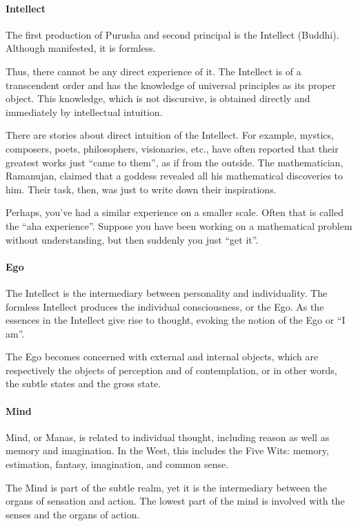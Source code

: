 \paragraph{Intellect}
The first production of Purusha and second principal is the Intellect (Buddhi). Although manifested, it is formless.

Thus, there cannot be any direct experience of it. The Intellect is of a transcendent order and has the knowledge of universal principles as its proper object. This knowledge, which is not discursive, is obtained directly and immediately by intellectual intuition.

There are stories about direct intuition of the Intellect. For example, mystics, composers, poets, philosophers, visionaries, etc., have often reported that their greatest works just “came to them”, as if from the outside. The mathematician, Ramanujan, claimed that a goddess revealed all his mathematical discoveries to him. Their task, then, was just to write down their inspirations.

Perhaps, you’ve had a similar experience on a smaller scale. Often that is called the “aha experience”. Suppose you have been working on a mathematical problem without understanding, but then suddenly you just “get it”.

\paragraph{Ego}
The Intellect is the intermediary between personality and individuality. The formless Intellect produces the individual consciousness, or the Ego. As the essences in the Intellect give rise to thought, evoking the notion of the Ego or “I am”.

The Ego becomes concerned with external and internal objects, which are respectively the objects of perception and of contemplation, or in other words, the subtle states and the gross state.

\paragraph{Mind}
Mind, or Manas, is related to individual thought, including reason as well as memory and imagination. In the West, this includes the Five Wits: memory, estimation, fantasy, imagination, and common sense.

The Mind is part of the subtle realm, yet it is the intermediary between the organs of sensation and action. The lowest part of the mind is involved with the senses and the organs of action.

